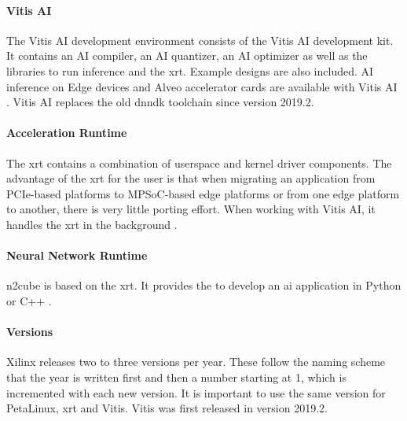 \paragraph{Vitis AI}
The Vitis AI development environment consists of the Vitis AI development kit.
It contains an AI compiler, an AI quantizer, an AI optimizer as well as the libraries to run inference and the \acrfull{xrt}.
Example designs are also included.
AI inference on Edge devices and Alveo accelerator cards are available with Vitis AI \cite{vitis_ai_user_guide}.
Vitis AI replaces the old \acrshort{dnndk} toolchain since version 2019.2.

\paragraph{Acceleration Runtime}
The \acrfull{xrt} contains a combination of userspace and kernel driver components.
The advantage of the \acrshort{xrt} for the user is that when migrating an application from PCIe-based platforms to MPSoC-based edge platforms or from one edge platform to another, there is very little porting effort.
When working with Vitis AI, it handles the \acrshort{xrt} in the background \cite{xrt_overview}.

\paragraph{Neural Network Runtime}
\acrshort{n2cube} is based on the \acrshort{xrt}.
It provides the  to develop an \acrshort{ai} application in Python or C++ \cite{vitis_ai_user_guide}.

\paragraph{Versions}
Xilinx releases two to three versions per year.
These follow the naming scheme that the year is written first and then a number starting at 1, which is incremented with each new version.
It is important to use the same version for PetaLinux, \acrshort{xrt} and Vitis.
Vitis was first released in version 2019.2.

